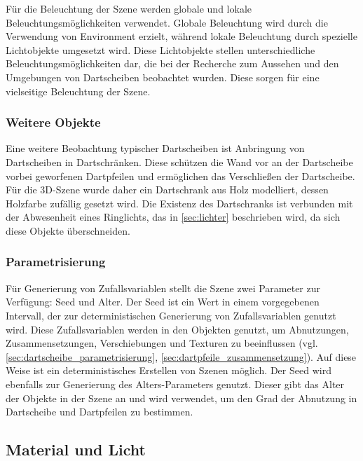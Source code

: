Für die Beleuchtung der Szene werden globale und lokale Beleuchtungsmöglichkeiten verwendet. Globale Beleuchtung wird durch die Verwendung von Environment erzielt, während lokale Beleuchtung durch spezielle Lichtobjekte umgesetzt wird. Diese Lichtobjekte stellen unterschiedliche Beleuchtungsmöglichkeiten dar, die bei der Recherche zum Aussehen und den Umgebungen von Dartscheiben beobachtet wurden. Diese sorgen für eine vielseitige Beleuchtung der Szene.

\subsubsection{Weitere Objekte}
\label{sec:weitere_objekte}

Eine weitere Beobachtung typischer Dartscheiben ist Anbringung von Dartscheiben in Dartschränken. Diese schützen die Wand vor an der Dartscheibe vorbei geworfenen Dartpfeilen und ermöglichen das Verschließen der Dartscheibe. Für die 3D-Szene wurde daher ein Dartschrank aus Holz modelliert, dessen Holzfarbe zufällig gesetzt wird. Die Existenz des Dartschranks ist verbunden mit der Abwesenheit eines Ringlichts, das in \autoref{sec:lichter} beschrieben wird, da sich diese Objekte überschneiden.

\subsubsection{Parametrisierung}
\label{sec:parameter}

Für Generierung von Zufallsvariablen stellt die Szene zwei Parameter zur Verfügung: Seed und Alter. Der Seed ist ein Wert in einem vorgegebenen Intervall, der zur deterministischen Generierung von Zufallsvariablen genutzt wird. Diese Zufallsvariablen werden in den Objekten genutzt, um Abnutzungen, Zusammensetzungen, Verschiebungen und Texturen zu beeinflussen (vgl. \autoref{sec:dartscheibe_parametrisierung}, \autoref{sec:dartpfeile_zusammensetzung}). Auf diese Weise ist ein deterministisches Erstellen von Szenen möglich. Der Seed wird ebenfalls zur Generierung des Alters-Parameters genutzt. Dieser gibt das Alter der Objekte in der Szene an und wird verwendet, um den Grad der Abnutzung in Dartscheibe und Dartpfeilen zu bestimmen.


\subsection{Material und Licht}  %
\label{sec:material_licht}

